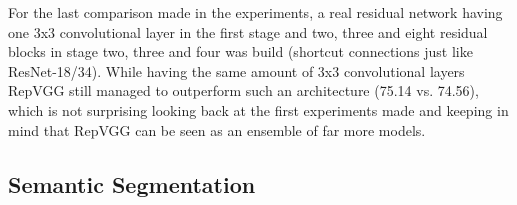 For the last comparison made in the experiments, a real residual network having one 3x3 convolutional layer in the first stage and two, three and eight residual blocks in stage two, three and four was build (shortcut connections just like ResNet-18/34). While having the same amount of 3x3 convolutional layers RepVGG still managed to outperform such an architecture (75.14 vs. 74.56), which is not surprising looking back at the first experiments made and keeping in mind that RepVGG can be seen as an ensemble of far more models. 

\subsection{Semantic Segmentation}
